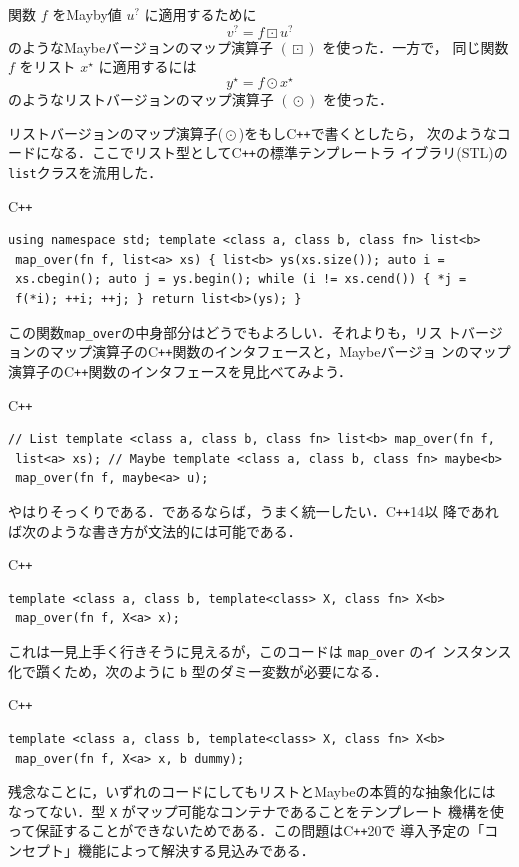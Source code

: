 \documentclass[a5paper,twoside,fleqn]{jsbook}
\newcommand{\programminglanguage}[1]{\textsf{#1}}
\newcommand{\cxx}{\programminglanguage{C}\texttt{++}}
\newcommand{\cxxfourteen}{\cxx\programminglanguage{14}}
\newcommand{\cxxtwelve}{\cxx\programminglanguage{20}}
\newcommand{\code}[1]{\texttt{#1}}
\newenvironment{cxxcode}{\begin{itembox}[r]{\cxx}}{\end{itembox}}
\DeclareMathOperator{\mMapList}{\odot}
\DeclareMathOperator{\mMapMaybe}{\boxdot}
\newcommand{\mList}[1]{{#1}^\mathrm{\star}}
\newcommand{\mMaybe}[1]{{#1}^?}
\begin{document}
関数 $f$ をMayby値 $\mMaybe{u}$ に適用するために
\begin{equation}
\mMaybe{v}=f\mMapMaybe\mMaybe{u}
\end{equation}
のようなMaybeバージョンのマップ演算子 $(\mMapMaybe)$ を使った．一方で，
同じ関数 $f$ をリスト $\mList{x}$ に適用するには
\begin{equation}
\mList{y}=f\mMapList\mList{x}
\end{equation}
のようなリストバージョンのマップ演算子 $(\mMapList)$ を使った．

リストバージョンのマップ演算子($\mMapList$)をもし\cxx で書くとしたら，
次のようなコードになる．ここでリスト型として\cxx の標準テンプレートラ
イブラリ(STL)の\code{list}クラスを流用した．
\begin{cxxcode}
\begin{verbatim}
using namespace std; template <class a, class b, class fn> list<b>
 map_over(fn f, list<a> xs) { list<b> ys(xs.size()); auto i =
 xs.cbegin(); auto j = ys.begin(); while (i != xs.cend()) { *j =
 f(*i); ++i; ++j; } return list<b>(ys); }
\end{verbatim}
\end{cxxcode}
この関数\code{map\_over}の中身部分はどうでもよろしい．それよりも，リス
トバージョンのマップ演算子の\cxx 関数のインタフェースと，Maybeバージョ
ンのマップ演算子の\cxx 関数のインタフェースを見比べてみよう．
\begin{cxxcode}
\begin{verbatim}
// List template <class a, class b, class fn> list<b> map_over(fn f,
 list<a> xs); // Maybe template <class a, class b, class fn> maybe<b>
 map_over(fn f, maybe<a> u);
\end{verbatim}
\end{cxxcode}
やはりそっくりである．であるならば，うまく統一したい．\cxxfourteen 以
降であれば次のような書き方が文法的には可能である．
\begin{cxxcode}
\begin{verbatim}
template <class a, class b, template<class> X, class fn> X<b>
 map_over(fn f, X<a> x);
\end{verbatim}
\end{cxxcode}
これは一見上手く行きそうに見えるが，このコードは \code{map\_over} のイ
ンスタンス化で躓くため，次のように \code{b} 型のダミー変数が必要になる．
\begin{cxxcode}
\begin{verbatim}
template <class a, class b, template<class> X, class fn> X<b>
 map_over(fn f, X<a> x, b dummy);
\end{verbatim}
\end{cxxcode}
残念なことに，いずれのコードにしてもリストとMaybeの本質的な抽象化には
なってない．型 \code{X} がマップ可能なコンテナであることをテンプレート
機構を使って保証することができないためである．この問題は\cxxtwelve で
導入予定の「コンセプト」機能によって解決する見込みである．
\end{document}
